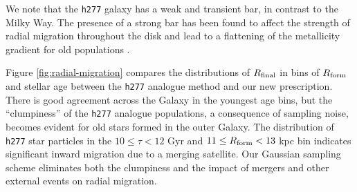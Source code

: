 \documentclass[twocolumn,twocolappendix,linenumbers]{aastex631}
\newcommand{\hydro}{{\tt h277}\xspace}
\newcommand{\todo}[1]{{\color{red}#1}}
\begin{document}
We note that the \hydro galaxy has a weak and transient bar, in contrast to the Milky Way. The presence of a strong bar has been found to affect the strength of radial migration throughout the disk \citep[e.g.,][]{Brunetti2011-BarredSpiralDiffusion} and lead to a flattening of the metallicity gradient for old populations \citep{Okalidis2022-AurigaMigration}.

Figure \ref{fig:radial-migration} compares the distributions of $R_{\rm final}$ in bins of $R_{\rm form}$ and stellar age between the \hydro analogue method and our new prescription. There is good agreement across the Galaxy in the youngest age bins, but the ``clumpiness'' of the \hydro analogue populations, a consequence of sampling noise, becomes evident for old stars formed in the outer Galaxy. The distribution of \hydro star particles in the $10\leq\tau<12$ Gyr and $11\leq R_{\rm form}<13$ kpc bin indicates significant inward migration due to a merging satellite. Our Gaussian sampling scheme eliminates both the clumpiness and the impact of mergers and other external events on radial migration.
\end{document}
